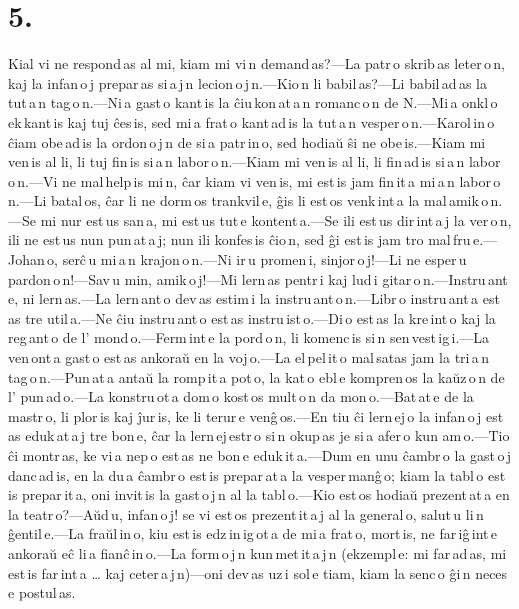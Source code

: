 \documentclass[ngerman,12pt,twoside]{book}
\begin{document}
\section*{5.}

 Kial vi ne respond\,as al mi, kiam mi vi\,n demand\,as?---La patr\,o skrib\,as leter\,o\,n, kaj la infan\,o\,j prepar\,as si\,a\,j\,n lecion\,o\,j\,n.---Kio\,n li babil\,as?---Li babil\,ad\,as la tut\,a\,n tag\,o\,n.---Ni\,a gast\,o kant\,is la ĉiu\,kon\,at\,a\,n romanc\,o\,n de N.---Mi\,a onkl\,o ek\,kant\,is kaj tuj ĉes\,is, sed mi\,a frat\,o kant\,ad\,is la tut\,a\,n vesper\,o\,n.---Karol\,in\,o ĉiam obe\,ad\,is la ordon\,o\,j\,n de si\,a patr\,in\,o, sed hodiaŭ ŝi ne obe\,is.---Kiam mi ven\,is al li, li tuj fin\,is si\,a\,n labor\,o\,n.---Kiam mi ven\,is al li, li fin\,ad\,is si\,a\,n labor\,o\,n.---Vi ne mal\,help\,is mi\,n, ĉar kiam vi ven\,is, mi est\,is jam fin\,it\,a mi\,a\,n labor\,o\,n.---Li batal\,os, ĉar li ne dorm\,os trankvil\,e, ĝis li est\,os venk\,int\,a la mal\,amik\,o\,n.---Se mi nur est\,us san\,a, mi est\,us tut\,e kontent\,a.---Se ili est\,us dir\,int\,a\,j la ver\,o\,n, ili ne est\,us nun pun\,at\,a\,j; nun ili konfes\,is ĉio\,n, sed ĝi est\,is jam tro mal\,fru\,e.---Johan\,o, serĉ\,u mi\,a\,n krajon\,o\,n.---Ni ir\,u promen\,i, sinjor\,o\,j!---Li ne esper\,u pardon\,o\,n!---Sav\,u min, amik\,o\,j!---Mi lern\,as pentr\,i kaj lud\,i gitar\,o\,n.---Instru\,ant\,e, ni lern\,as.---La lern\,ant\,o dev\,as estim\,i la instru\,ant\,o\,n.---Libr\,o instru\,ant\,a est\,as tre util\,a.---Ne ĉiu instru\,ant\,o est\,as instru\,ist\,o.---Di\,o est\,as la kre\,int\,o kaj la reg\,ant\,o de l' mond\,o.---Ferm\,int\,e la pord\,o\,n, li komenc\,is si\,n sen\,vest\,ig\,i.---La ven\,ont\,a gast\,o est\,as ankoraŭ en la voj\,o.---La el\,pel\,it\,o mal\,satas jam la tri\,a\,n tag\,o\,n.---Pun\,at\,a antaŭ la romp\,it\,a pot\,o, la kat\,o ebl\,e kompren\,os la kaŭz\,o\,n de l' pun\,ad\,o.---La konstru\,ot\,a dom\,o kost\,os mult\,o\,n da mon\,o.---Bat\,at\,e de la mastr\,o, li plor\,is kaj ĵur\,is, ke li terur\,e venĝ\,os.---En tiu ĉi lern\,ej\,o la infan\,o\,j est\,as eduk\,at\,a\,j tre bon\,e, ĉar la lern\,ej\,estr\,o si\,n okup\,as je si\,a afer\,o kun am\,o.---Tio ĉi montr\,as, ke vi\,a nep\,o est\,as ne bon\,e eduk\,it\,a.---Dum en unu ĉambr\,o la gast\,o\,j danc\,ad\,is, en la du\,a ĉambr\,o est\,is prepar\,at\,a la vesper\,manĝ\,o; kiam la tabl\,o est\,is prepar\,it\,a, oni invit\,is la gast\,o\,j\,n al la tabl\,o.---Kio est\,os hodiaŭ prezent\,at\,a en la teatr\,o?---Aŭd\,u, infan\,o\,j! se vi est\,os prezent\,it\,a\,j al la general\,o, salut\,u li\,n ĝentil\,e.---La fraŭl\,in\,o, kiu est\,is edz\,in\,ig\,ot\,a de mi\,a frat\,o, mort\,is, ne far\,iĝ\,int\,e ankoraŭ eĉ li\,a fianĉ\,in\,o.---La form\,o\,j\,n kun\,met\,it\,a\,j\,n (ekzempl\,e: mi far\,ad\,as, mi est\,is far\,int\,a \ldots{} kaj ceter\,a\,j\,n)---oni dev\,as uz\,i sol\,e tiam, kiam la senc\,o ĝi\,n neces\,e postul\,as.
\end{document}
